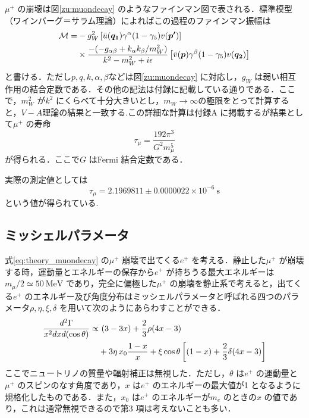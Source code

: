 $\mu^{+}$ の崩壊は図\ref{zu:muondecay} のようなファインマン図で表される．標準模型（ワインバーグ＝サラム理論）によればこの過程のファインマン振幅は
\begin{align}
\mathcal{M} = &-g_{W}^2\left[\Bar{u}(\bm{q_{1}})\gamma^{\alpha}(1 - \gamma_{5})v(\bm{p'})\right] \notag \\ 
&\times \frac{-(-g_{\alpha\beta} + k_{\alpha}k_{\beta}/m_{W}^2)}{k^{2} - m_{W}^2 + i\epsilon}\left[\Bar{v}(\bm{p})\gamma^{\beta}(1 - \gamma_5)v(\bm{q_{2}})\right]
\label{eq:theory_muondecayamp}
\end{align}%
と書ける．ただし$p, q, k, \alpha, \beta$などは図\ref{zu:muondecay} に対応し，$g_{W}$ は弱い相互作用の結合定数である．その他の記法は付録に記載している通りである．ここで，$m_{W}^2$ が$k^2$ にくらべて十分大きいとし，$m_{W} \rightarrow \infty$の極限をとって計算すると，$V-A$理論の結果と一致する.この詳細な計算は付録A に掲載するが結果として$\mu^+$ の寿命
\begin{equation}
\tau_{\mu} = \frac{192\pi^3}{G^{2} m_{\mu}^{5}}
\label{eq:thory_muonlifetime}
\end{equation}
が得られる．ここで$G$ はFermi 結合定数である．

実際の測定値としては
\[\tau_{\mu} = 2.1969811 \pm 0.0000022 \times 10^{-6}~\mathrm{s}\]
という値が得られている\cite{PDG}.
	
\subsection{ミッシェルパラメータ}
式\eqref{eq:theory_muondecay} の$\mu^{+}$ 崩壊で出てくる$e^{+}$ を考える．静止した$\mu^{+}$ が崩壊する時，運動量とエネルギーの保存から$e^{+}$ が持ちうる最大エネルギーは$m_{\mu}/2 \simeq 50~\mathrm{MeV}$ であり，完全に偏極した$\mu^{+}$ の崩壊を静止系で考えると，出てくる$e^{+}$ のエネルギー及び角度分布はミッシェルパラメータと呼ばれる四つのパラメータ$\rho, \eta, \xi, \delta$ を用いて次のようにあらわすことができる\cite{michel_parameter}．
\begin{align}
\frac{d^2\Gamma}{x^{2}dxd(\cos \theta)} \propto& \,\,(3 - 3x) + \frac{2}{3}\rho (4x - 3) \notag \\
&+ 3 \eta \,x_{0} \frac{1-x}{x} + \xi \cos \theta \left[(1 - x) + \frac{2}{3} \delta (4x - 3)\right]
\label{eq:theory_michel}
\end{align}
ここでニュートリノの質量や輻射補正は無視した．ただし，$\theta$ は$e^{+}$ の運動量と$\mu^{+}$ のスピンのなす角度であり，$x$ は$e^{+}$ のエネルギーの最大値が1 となるように規格化したものである．また，$x_0$ は$e^{+}$ のエネルギーが$m_{e}$ のときの$x$ の値であり，これは通常無視できるので第3 項は考えないことも多い．

